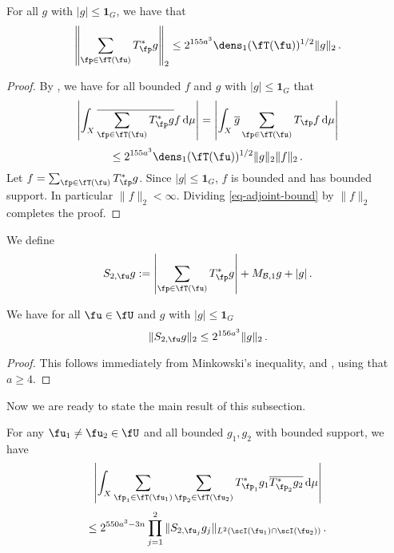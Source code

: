 \begin{lemma}
    \label{adjoint-tree-estimate}
    \leanok
    For all $g$ with $|g| \le \mathbf{1}_G$, we have that
    $$
        \left\| \sum_{\fp \in \fT(\fu)} T_{\fp}^* g\right\|_2 \le 2^{155a^3} \dens_1(\fT(\fu))^{1/2} \|g\|_2\,.
    $$
\end{lemma}

\begin{proof}
    \leanok
    By , we have for all bounded $f$ and $g$ with $|g| \le \mathbf{1}_G$ that
    $$
        \left| \int_X \overline{\sum_{\fp\in \fT(\fu)} T_{\fp}^* g} f \,\mathrm{d}\mu \right| = \left| \int_X \overline{g} \sum_{\fp \in \fT(\fu)} T_{\fp} f \,\mathrm{d}\mu \right|
    $$
    \begin{equation}
        \label{eq-adjoint-bound}
        \le 2^{155a^3} \dens_1(\fT(\fu))^{1/2} \|g\|_2 \|f\|_2\,.
    \end{equation}
    Let $f = \sum_{\fp \in \fT(\fu)} T_{\fp}^* g$. Since $|g| \le \mathbf{1}_G$, $f$ is bounded and has bounded support. In particular $\|f\|_2 < \infty$. Dividing \eqref{eq-adjoint-bound} by $\|f\|_2$ completes the proof.
\end{proof}

We define
$$
    S_{2,\fu}g := \left|\sum_{\fp \in \fT(\fu)} T_{\fp}^*g \right| + M_{\mathcal{B},1}g + |g|\,.
$$
\begin{lemma}
    \label{adjoint-tree-control}
    \leanok
    We have for all $\fu \in \fU$ and $g$ with $|g| \le \mathbf{1}_G$
    $$
        \|S_{2, \fu} g\|_2 \le 2^{156a^3} \|g\|_2\,.
    $$
\end{lemma}

\begin{proof}
    \leanok
    This follows immediately from Minkowski's inequality,  and , using that $a \ge 4$.
\end{proof}


Now we are ready to state the main result of this subsection.

\begin{lemma}
    \label{correlation-separated-trees}
    \leanok
    For any $\fu_1 \ne \fu_2 \in \fU$ and all bounded $g_1, g_2$ with bounded support, we have
    \begin{equation}
        \label{eq-lhs-sep-tree}
        \left| \int_X \sum_{\fp_1 \in \fT(\fu_1)} \sum_{\fp_2 \in \fT(\fu_2)} T^*_{\fp_1}g_1 \overline{T^*_{\fp_2}g_2 }\,\mathrm{d}\mu \right|
    \end{equation}
    \begin{equation}
        \label{eq-rhs-sep-tree}
        \le 2^{550a^3-3n} \prod_{j =1}^2 \| S_{2, \fu_j} g_j\|_{L^2(\scI(\fu_1) \cap \scI(\fu_2))}\,.
    \end{equation}
\end{lemma}

